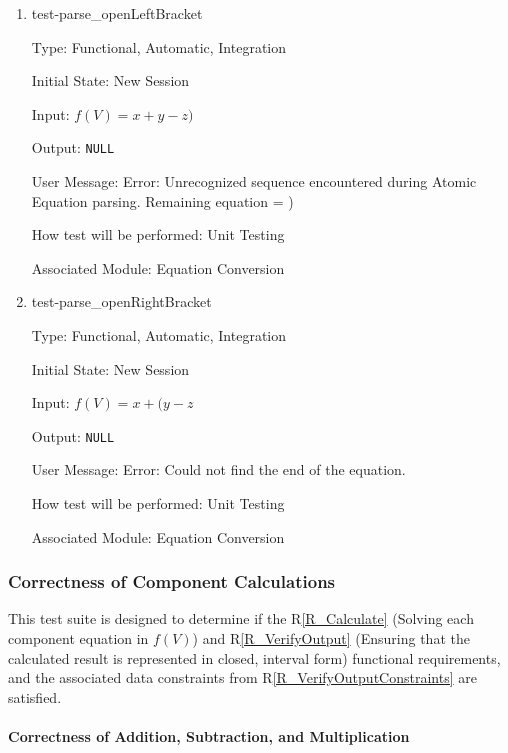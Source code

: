 \documentclass[12pt, titlepage]{article}
\newcommand{\rref}[1]{R\ref{#1}}
\begin{document}
\begin{enumerate}
	
	\item{test-parse\_openLeftBracket}
	
	Type: Functional, Automatic, Integration
	
	Initial State: New Session
	
	Input: $f(V) = x + y - z)$
	
	Output: \texttt{NULL}
	
	User Message: Error: Unrecognized sequence encountered during Atomic 
	Equation parsing. Remaining equation = )
	
	How test will be performed: Unit Testing
	
	Associated Module: Equation Conversion\\
	
	\item{test-parse\_openRightBracket}
	
	Type: Functional, Automatic, Integration
	
	Initial State: New Session
	
	Input: $f(V) = x + (y - z$
	
	Output: \texttt{NULL}
	
	User Message: Error: Could not find the end of the equation.
	
	How test will be performed: Unit Testing
	
	Associated Module: Equation Conversion\\
	
\end{enumerate}

\subsubsection{Correctness of Component Calculations}
\label{tests_correctnessOfCalculations}
This test suite is designed to determine if the \rref{R_Calculate} 
(Solving each component equation in $f(V)$) and \rref{R_VerifyOutput} (Ensuring 
that the calculated result is represented in closed, interval form) functional 
requirements, and the associated data constraints from 
\rref{R_VerifyOutputConstraints} are satisfied.

\paragraph{Correctness of Addition, Subtraction, and Multiplication}
\end{document}
